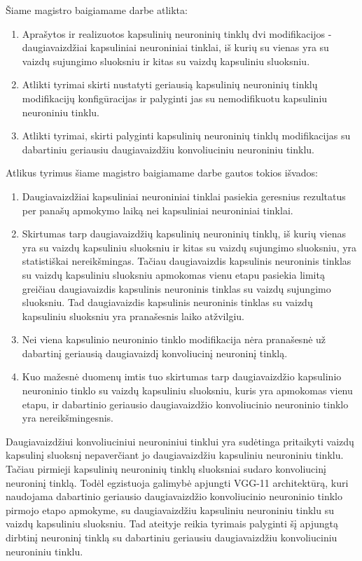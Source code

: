 
Šiame magistro baigiamame darbe atlikta:

\begin{enumerate}
	\item Aprašytos ir realizuotos kapsulinių neuroninių tinklų dvi modifikacijos - daugiavaizdžiai kapsuliniai neuroniniai tinklai, iš kurių su vienas yra su vaizdų sujungimo sluoksniu ir kitas su vaizdų kapsuliniu sluoksniu.
	\item Atlikti tyrimai skirti nustatyti geriausią kapsulinių neuroninių tinklų modifikacijų konfigūracijas ir palyginti jas su nemodifikuotu kapsuliniu neuroniniu tinklu.
	\item Atlikti tyrimai, skirti palyginti kapsulinių neuroninių tinklų modifikacijas su dabartiniu geriausiu daugiavaizdžiu konvoliuciniu neuroniniu tinklu.
\end{enumerate}

Atlikus tyrimus šiame magistro baigiamame darbe gautos tokios išvados:

\begin{enumerate}
	\item Daugiavaizdžiai kapsuliniai neuroniniai tinklai pasiekia geresnius rezultatus per panašų apmokymo laiką nei kapsuliniai neuroniniai tinklai.
	\item Skirtumas tarp daugiavaizdžių kapsulinių neuroninių tinklų, iš kurių vienas yra su vaizdų kapsuliniu sluoksniu ir kitas su vaizdų sujungimo sluoksniu, yra statistiškai nereikšmingas. Tačiau daugiavaizdis kapsulinis neuroninis tinklas su vaizdų kapsuliniu sluoksniu apmokomas vienu etapu pasiekia limitą greičiau daugiavaizdis kapsulinis neuroninis tinklas su vaizdų sujungimo sluoksniu. Tad daugiavaizdis kapsulinis neuroninis tinklas su vaizdų kapsuliniu sluoksniu yra pranašesnis laiko atžvilgiu.
	\item Nei viena kapsulinio neuroninio tinklo modifikacija nėra pranašesnė už dabartinį geriausią daugiavaizdį konvoliucinį neuroninį tinklą.
	\item Kuo mažesnė duomenų imtis tuo skirtumas tarp daugiavaizdžio kapsulinio neuroninio tinklo su vaizdų kapsuliniu sluoksniu, kuris yra apmokomas vienu etapu, ir dabartinio geriausio daugiavaizdžio konvoliucinio neuroninio tinklo yra nereikšmingesnis.
\end{enumerate}

Daugiavaizdžiui konvoliuciniui neuroniniui tinklui yra sudėtinga pritaikyti vaizdų kapsulinį sluoksnį nepaverčiant jo daugiavaizdžiu kapsuliniu neuroniniu tinklu. Tačiau pirmieji kapsulinių neuroninių tinklų sluoksniai sudaro konvoliucinį neuroninį tinklą. Todėl egzistuoja galimybė apjungti VGG-11 architektūrą, kuri naudojama dabartinio geriausio daugiavaizdžio konvoliucinio neuroninio tinklo pirmojo etapo apmokyme, su daugiavaizdžiu kapsuliniu neuroniniu tinklu su vaizdų kapsuliniu sluoksniu. Tad ateityje reikia tyrimais palyginti šį apjungtą dirbtinį neuroninį tinklą su dabartiniu geriausiu daugiavaizdžiu konvoliuciniu neuroniniu tinklu.
